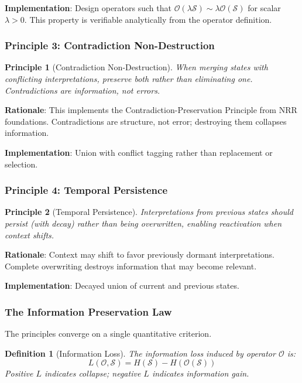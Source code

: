 \documentclass[11pt,a4paper]{article}
\newtheorem{definition}{Definition}
\newtheorem{principle}{Principle}
\begin{document}
\textbf{Implementation}: Design operators such that 
$\mathcal{O}(\lambda \mathcal{S}) \sim \lambda \mathcal{O}(\mathcal{S})$ 
for scalar $\lambda > 0$. This property is verifiable analytically 
from the operator definition.

\subsubsection{Principle 3: Contradiction Non-Destruction}

\begin{principle}[Contradiction Non-Destruction]
\label{prin:contradiction}
When merging states with conflicting interpretations, preserve 
both rather than eliminating one. Contradictions are information, 
not errors.
\end{principle}

\textbf{Rationale}: This implements the Contradiction-Preservation 
Principle from NRR foundations. Contradictions are structure, not 
error; destroying them collapses information.

\textbf{Implementation}: Union with conflict tagging rather than 
replacement or selection.

\subsubsection{Principle 4: Temporal Persistence}

\begin{principle}[Temporal Persistence]
\label{prin:temporal}
Interpretations from previous states should persist (with decay) 
rather than being overwritten, enabling reactivation when context 
shifts.
\end{principle}

\textbf{Rationale}: Context may shift to favor previously dormant 
interpretations. Complete overwriting destroys information that 
may become relevant.

\textbf{Implementation}: Decayed union of current and previous states.

\subsubsection{The Information Preservation Law}

The principles converge on a single quantitative criterion.

\begin{definition}[Information Loss]
The information loss induced by operator $\mathcal{O}$ is:
\begin{equation}
L(\mathcal{O}, \mathcal{S}) = H(\mathcal{S}) - H(\mathcal{O}(\mathcal{S}))
\end{equation}
Positive $L$ indicates collapse; negative $L$ indicates information gain.
\end{definition}
\end{document}
